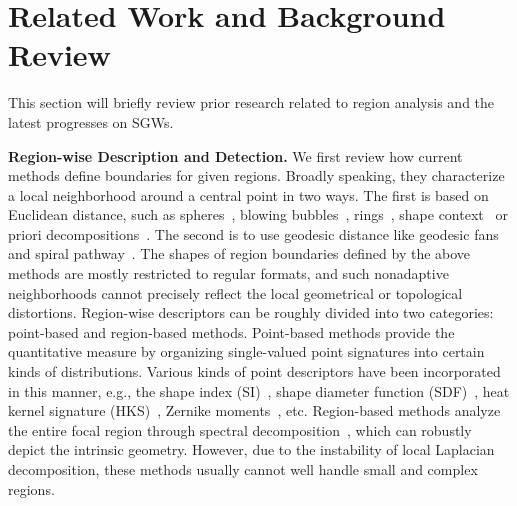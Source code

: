 \section{Related Work and Background Review}
\label{sec:RW}

This section will briefly review prior research related to region
analysis and the latest progresses on SGWs.

\textbf{Region-wise Description and Detection.} We first review how
current methods define boundaries for given regions. Broadly speaking,
they characterize a local neighborhood around a central point in two
ways. The first is based on Euclidean distance, such as
spheres~\cite{Kazhdan:2003}, blowing bubbles~\cite{Mortara:03},
rings~\cite{Gatzke:2005}, shape context~\cite{Kokkinos:2012} or priori
decompositions~\cite{Gal2006,Itskovich2011}. The second is to use
geodesic distance like geodesic fans~\cite{Zelinka:2004} and spiral
pathway~\cite{Lavoue:2011}. The shapes of region boundaries defined by
the above methods are mostly restricted to regular formats, and such
nonadaptive neighborhoods cannot precisely reflect the local
geometrical or topological distortions. Region-wise descriptors can be
roughly divided into two categories: point-based and region-based
methods. Point-based methods provide the quantitative measure by
organizing single-valued point signatures into certain kinds of
distributions. Various kinds of point descriptors have been
incorporated in this manner, e.g., the shape index
(SI)~\cite{Toldo:2009}, shape diameter function
(SDF)~\cite{Shapira:2010}, heat kernel signature
(HKS)~\cite{Bronstein:2013}, Zernike
moments~\cite{Maximo:2011:RRI:2027471}, etc. Region-based methods
analyze the entire focal region through spectral
decomposition~\cite{Hu2009,JiangZZ:13}, which can robustly depict the
intrinsic geometry. However, due to the instability of local Laplacian
decomposition, these methods usually cannot well handle small and
complex regions.

